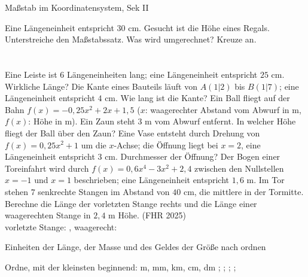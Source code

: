 \begin{aufgabe}{Maßstab im Koordinatensystem, Sek II}
\begin{teile}
\teil Eine Längeneinheit entspricht $30$ cm. Gesucht ist die Höhe eines Regals. Unterstreiche den Maßstabssatz. Was wird umgerechnet? Kreuze an.\\ \\ \\ 
\teil Eine Leiste ist $6$ Längeneinheiten lang; eine Längeneinheit entspricht $25$ cm. Wirkliche Länge? \leerfeld[cm]
\teil Die Kante eines Bauteils läuft von $A(1|2)$ bis $B(1|7)$; eine Längeneinheit entspricht $4$ cm. Wie lang ist die Kante? \leerfeld[cm]
\teil Ein Ball fliegt auf der Bahn $f(x) = -0{,}25x^2 + 2x + 1{,}5$ ($x$: waagerechter Abstand vom Abwurf in m, $f(x)$: Höhe in m). Ein Zaun steht $3$ m vom Abwurf entfernt. In welcher Höhe fliegt der Ball über den Zaun? \leerfeld[m]
\teil Eine Vase entsteht durch Drehung von $f(x) = 0{,}25x^2 + 1$ um die $x$-Achse; die Öffnung liegt bei $x = 2$, eine Längeneinheit entspricht $3$ cm. Durchmesser der Öffnung? \leerfeld[cm]
\teil Der Bogen einer Toreinfahrt wird durch $f(x) = 0{,}6x^4 - 3x^2 + 2{,}4$ zwischen den Nullstellen $x = -1$ und $x = 1$ beschrieben; eine Längeneinheit entspricht $1{,}6$ m. Im Tor stehen $7$ senkrechte Stangen im Abstand von $40$ cm, die mittlere in der Tormitte. Berechne die Länge der vorletzten Stange rechts und die Länge einer waagerechten Stange in $2{,}4$ m Höhe. \hfill (FHR 2025) \\ vorletzte Stange: \leerfeld[m] , waagerecht: \leerfeld[m]
\end{teile}
\end{aufgabe}

\begin{aufgabe}{Einheiten der Länge, der Masse und des Geldes der Größe nach ordnen}
\begin{teile}
\teil Ordne, mit der kleinsten beginnend: m, mm, km, cm, dm \leerfeld ; \leerfeld ; \leerfeld ; \leerfeld ; \leerfeld
\end{teile}
\end{aufgabe}

